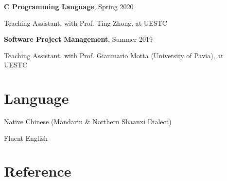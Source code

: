 \documentclass{article}
\begin{document}
\textbf{C Programming Language}, Spring 2020

\hspace{2em}Teaching Assistant, with Prof. Ting Zhong, at UESTC

\textbf{Software Project Management}, Summer 2019

\hspace{2em}Teaching Assistant, with Prof. Gianmario Motta (University of Pavia), at UESTC







\vspace{-8pt}
\section*{Language}
\vspace{-4pt}
\indent

Native Chinese (Mandarin \& Northern Shaanxi Dialect)

Fluent English





\vspace{-8pt}
\section*{Reference}
\vspace{-4pt}
\indent
\end{document}
